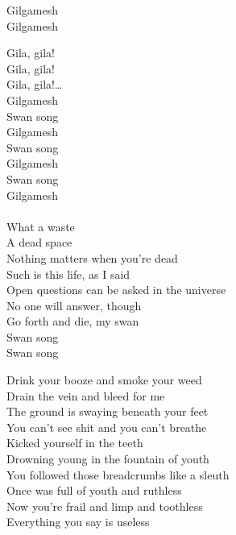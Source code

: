 Gilgamesh \\
Gilgamesh \\


Gila, gila! \\
Gila, gila! \\
Gila, gila!… \\

Gilgamesh \\
Swan song \\
Gilgamesh \\
Swan song \\
Gilgamesh \\
Swan song \\

Gilgamesh \\

 \\
What a waste \\
A dead space \\
Nothing matters when you're dead \\
Such is this life, as I said \\
Open questions can be asked in the universe \\
No one will answer, though \\
Go forth and die, my swan \\

Swan song \\
Swan song \\



Drink your booze and smoke your weed \\
Drain the vein and bleed for me \\
The ground is swaying beneath your feet \\
You can't see shit and you can't breathe \\
Kicked yourself in the teeth \\
Drowning young in the fountain of youth \\
You followed those breadcrumbs like a sleuth \\
Once was full of youth and ruthless \\
Now you're frail and limp and toothless \\
Everything you say is useless \\

